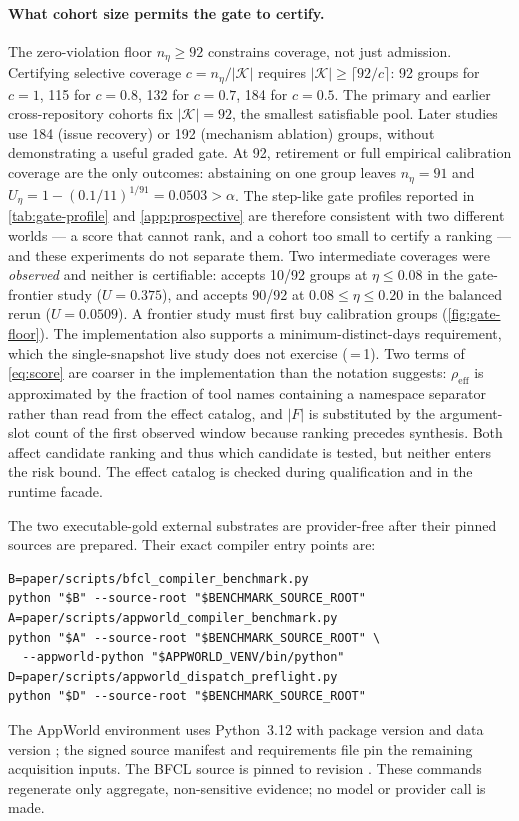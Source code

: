 \paragraph{What cohort size permits the gate to certify.}
The zero-violation floor $n_\eta\ge 92$ constrains coverage, not just admission.
Certifying selective coverage $c=n_\eta/|\mathcal{K}|$ requires
$|\mathcal{K}|\ge\lceil 92/c\rceil$: 92 groups for $c=1$, 115 for $c=0.8$, 132
for $c=0.7$, 184 for $c=0.5$. The primary and earlier cross-repository
cohorts fix $|\mathcal{K}|=92$, the smallest satisfiable pool. Later studies
use 184 (issue recovery) or 192 (mechanism ablation) groups, without
demonstrating a useful graded gate. At 92, retirement or full empirical
calibration coverage are the only outcomes: abstaining on one group leaves $n_\eta=91$ and
$U_\eta=1-(0.1/11)^{1/91}=0.0503>\alpha$. The step-like gate profiles reported
in \cref{tab:gate-profile} and \cref{app:prospective} are therefore consistent
with two different worlds --- a score that cannot rank, and a cohort too small
to certify a ranking --- and these experiments do not separate them. Two
intermediate coverages were \emph{observed} and neither is certifiable:
 accepts 10/92 groups at $\eta\le0.08$ in the
gate-frontier study ($U=0.375$), and  accepts 90/92 at
$0.08\le\eta\le0.20$ in the balanced rerun ($U=0.0509$). A frontier study must
first buy calibration groups (\cref{fig:gate-floor}). The implementation also supports a
minimum-distinct-days requirement, which the single-snapshot live study does not
exercise (\,=\,1). Two terms of \cref{eq:score} are coarser in
the implementation than the notation suggests: $\rho_{\mathrm{eff}}$ is
approximated by the fraction of tool names containing a namespace separator
rather than read from the effect catalog, and $|F|$ is substituted by the
argument-slot count of the first observed window because ranking precedes
synthesis. Both affect candidate ranking and thus which candidate is tested, but neither
enters the risk bound. The effect catalog is checked during qualification
and in the runtime facade.

The two executable-gold external substrates are provider-free after their pinned
sources are prepared. Their exact compiler entry points are:
\begin{verbatim}
B=paper/scripts/bfcl_compiler_benchmark.py
python "$B" --source-root "$BENCHMARK_SOURCE_ROOT"
A=paper/scripts/appworld_compiler_benchmark.py
python "$A" --source-root "$BENCHMARK_SOURCE_ROOT" \
  --appworld-python "$APPWORLD_VENV/bin/python"
D=paper/scripts/appworld_dispatch_preflight.py
python "$D" --source-root "$BENCHMARK_SOURCE_ROOT"
\end{verbatim}
The AppWorld environment uses Python~3.12 with package version
 and data version ; the signed source manifest and
requirements file pin the remaining acquisition inputs. The BFCL source is pinned
to revision \code{6ea57973c7a6}. These commands regenerate only aggregate,
non-sensitive evidence; no model or provider call is made.


